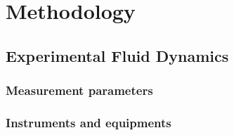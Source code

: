 
\chapter{Methodology}

\section{Experimental Fluid Dynamics}
\subsection{Measurement parameters}
\subsection{Instruments and equipments}

\clearpage %
